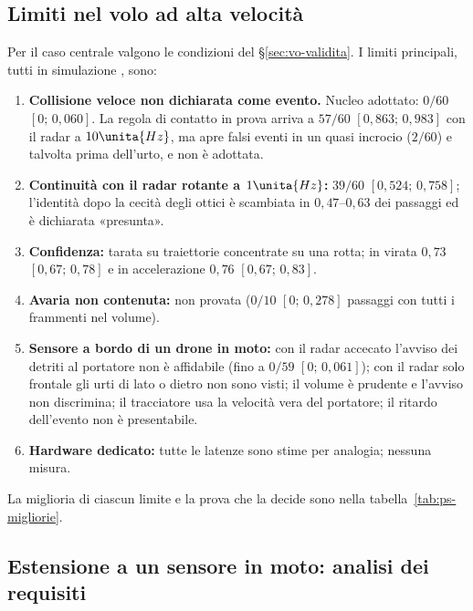\subsection{Limiti nel volo ad alta velocità}\label{sec:lim-volo}

Per il caso centrale valgono le condizioni del \S\ref{sec:vo-validita}. I limiti principali, tutti in simulazione , sono:
\begin{enumerate}[label=V\arabic*.,leftmargin=2.2em]
\item \textbf{Collisione veloce non dichiarata come evento.} Nucleo adottato: $0/60$ $[0;\,0{,}060]$. La regola di contatto in prova arriva a $57/60$ $[0{,}863;\,0{,}983]$ con il radar a $10\unita{Hz}$, ma apre falsi eventi in un quasi incrocio ($2/60$) e talvolta prima dell'urto, e non è adottata.
\item \textbf{Continuità con il radar rotante a $1\unita{Hz}$:} $39/60$ $[0{,}524;\,0{,}758]$; l'identità dopo la cecità degli ottici è scambiata in $0{,}47$--$0{,}63$ dei passaggi ed è dichiarata «presunta».
\item \textbf{Confidenza:} tarata su traiettorie concentrate su una rotta; in virata $0{,}73$ $[0{,}67;\,0{,}78]$ e in accelerazione $0{,}76$ $[0{,}67;\,0{,}83]$.
\item \textbf{Avaria non contenuta:} non provata ($0/10$ $[0;\,0{,}278]$ passaggi con tutti i frammenti nel volume).
\item \textbf{Sensore a bordo di un drone in moto:} con il radar accecato l'avviso dei detriti al portatore non è affidabile (fino a $0/59$ $[0;\,0{,}061]$); con il radar solo frontale gli urti di lato o dietro non sono visti; il volume è prudente e l'avviso non discrimina; il tracciatore usa la velocità vera del portatore; il ritardo dell'evento non è presentabile.
\item \textbf{Hardware dedicato:} tutte le latenze sono stime per analogia; nessuna misura.
\end{enumerate}
La miglioria di ciascun limite e la prova che la decide sono nella tabella~\ref{tab:ps-migliorie}.

\subsection{Estensione a un sensore in moto: analisi dei requisiti}\label{sec:lim-moto}

